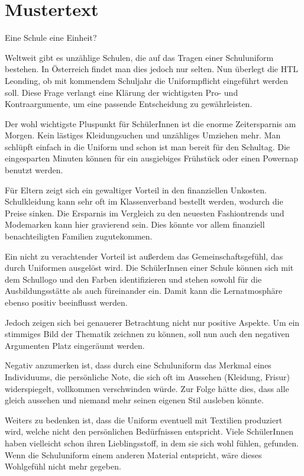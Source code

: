 

\section{Mustertext}
Eine Schule  eine Einheit?  

Weltweit gibt es unzählige Schulen, die auf das Tragen einer Schuluniform bestehen. In Österreich findet man dies jedoch nur selten. Nun überlegt die HTL Leonding, ob mit kommendem Schuljahr die Uniformpflicht eingeführt werden soll. Diese Frage verlangt eine Klärung der wichtigsten Pro- und Kontraargumente, um eine passende Entscheidung zu gewährleisten. 

Der wohl wichtigste Pluspunkt für SchülerInnen ist die enorme Zeitersparnis am Morgen. Kein lästiges Kleidungsuchen und unzähliges Umziehen mehr. Man schlüpft einfach in die Uniform und schon ist man bereit für den Schultag. Die eingesparten Minuten können für ein ausgiebiges Frühstück oder einen Powernap benutzt werden.  

Für Eltern zeigt sich ein gewaltiger Vorteil in den finanziellen Unkosten. Schulkleidung kann sehr oft im Klassenverband bestellt werden, wodurch die Preise sinken. Die Ersparnis im Vergleich zu den neuesten Fashiontrends und Modemarken kann hier gravierend sein. Dies könnte vor allem finanziell benachteiligten Familien zugutekommen.  

Ein nicht zu verachtender Vorteil ist außerdem das Gemeinschaftsgefühl, das durch Uniformen ausgelöst wird. Die SchülerInnen einer Schule können sich mit dem Schullogo und den Farben identifizieren und stehen sowohl für die Ausbildungsstätte als auch füreinander ein. Damit kann die Lernatmosphäre ebenso positiv beeinflusst werden. 

Jedoch zeigen sich bei genauerer Betrachtung nicht nur positive Aspekte. Um ein stimmiges Bild der Thematik zeichnen zu können, soll nun auch den negativen Argumenten Platz eingeräumt werden.  

Negativ anzumerken ist, dass durch eine Schuluniform das Merkmal eines Individuums, die persönliche Note, die sich oft im Aussehen (Kleidung, Frisur) widerspiegelt, vollkommen verschwinden würde. Zur Folge hätte dies, dass alle gleich aussehen und niemand mehr seinen eigenen Stil ausleben könnte.  

Weiters zu bedenken ist, dass die Uniform eventuell mit Textilien produziert wird, welche nicht den persönlichen Bedürfnissen entspricht. Viele SchülerInnen haben vielleicht schon ihren Lieblingsstoff, in dem sie sich wohl fühlen, gefunden. Wenn die Schuluniform einem anderen Material entspricht, wäre dieses Wohlgefühl nicht mehr gegeben.  

